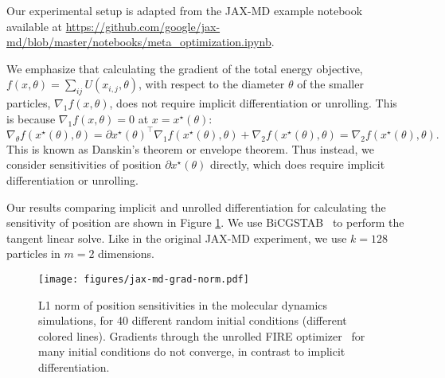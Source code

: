 \documentclass{article}
\begin{document}
Our experimental setup is adapted from the JAX-MD example notebook available at \url{https://github.com/google/jax-md/blob/master/notebooks/meta_optimization.ipynb}.
 
 We emphasize that calculating the gradient of the total energy objective, $f(x,
 \theta) = \sum_{ij} U(x_{i,j}, \theta)$, with respect to the diameter
 $\theta$ of the smaller particles, $\nabla_1 f(x, \theta)$, does not
 require implicit differentiation or unrolling.
This is because $\nabla_1 f(x, \theta) = 0$ at $x = x^\star(\theta)$:
\begin{equation}
\nabla_\theta f(x^\star(\theta), \theta)
= 
\partial x^\star(\theta)^\top \nabla_1 f(x^\star(\theta), \theta) +
\nabla_2 f(x^\star(\theta), \theta) =
\nabla_2 f(x^\star(\theta), \theta).
\end{equation}
This is known as Danskin's theorem or envelope theorem.  Thus instead, we
consider sensitivities of position $\partial x^\star(\theta)$ directly, which
does require implicit differentiation or unrolling.

Our results comparing implicit and unrolled differentiation for calculating the
sensitivity of position are shown in Figure \ref{fig:jax-md-grad-norm}. We use
BiCGSTAB~\cite{Vorst1992-bicgstab}
to perform the tangent linear solve.  Like in
the original JAX-MD experiment, we use $k=128$ particles in $m=2$ dimensions.

\begin{figure}[H]
    \centering
    \texttt{[image: figures/jax-md-grad-norm.pdf]}
    \caption{L1 norm of position sensitivities in the molecular dynamics simulations, for 40 different random initial conditions (different colored lines).
    Gradients through the unrolled FIRE optimizer~\cite{structural-relaxation-2006} for many initial conditions do not converge, in contrast to implicit differentiation.}
    \label{fig:jax-md-grad-norm}
\end{figure}

\end{document}

